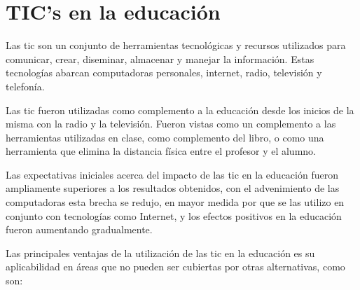 \chapter{TIC's en la educación}

Las \Gls{tic} son un conjunto de herramientas tecnológicas y recursos utilizados
para comunicar, crear, diseminar, almacenar y manejar la
información\cite{unesco:ict}. Estas tecnologías abarcan computadoras personales,
internet, radio, televisión y telefonía\cite{tinio:ict}.

Las \Gls{tic} fueron utilizadas como complemento a la educación desde los
inicios de la misma con la radio y la televisión. Fueron vistas como un
complemento a las herramientas utilizadas en clase, como complemento del libro,
o como una herramienta que elimina la distancia física entre el profesor y el
alumno\cite{unesco:ict}. 

Las expectativas iniciales acerca del impacto de las \Gls{tic} en la educación
fueron ampliamente superiores a los resultados obtenidos\cite{unesco:ict}, con
el advenimiento de las computadoras esta brecha se redujo, en mayor medida por
que se las utilizo en conjunto con tecnologías como Internet, y los efectos
positivos en la educación fueron aumentando gradualmente\cite{unesco:ict}.

Las principales ventajas de la utilización de las \Gls{tic} en la educación es
su aplicabilidad en áreas que no pueden ser cubiertas por otras alternativas,
como son:

